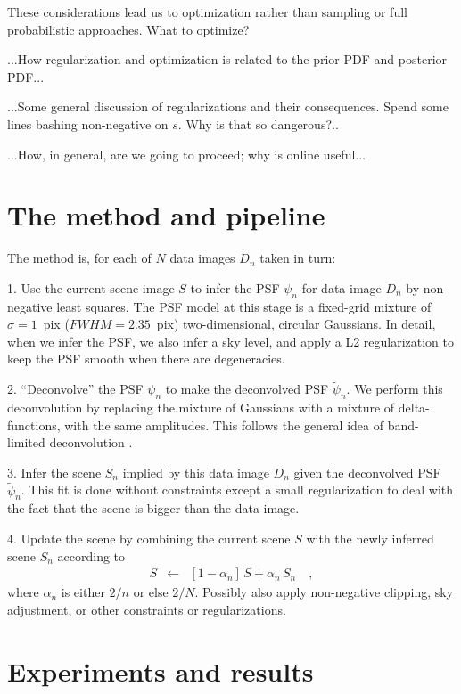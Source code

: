 \documentclass[12pt,preprint]{aastex}
\newcommand{\data}{D}
\newcommand{\scene}{S}
\newcommand{\psf}{\psi}
\newcommand{\dpsf}{\tilde{\psi}}
\begin{document}
These considerations lead us to optimization rather than sampling or
full probabilistic approaches.  What to optimize?

...How regularization and optimization is related to the prior PDF and posterior PDF...

...Some general discussion of regularizations and their consequences.
Spend some lines bashing non-negative on $s$.  Why is that so
dangerous?..

...How, in general, are we going to proceed; why is online useful...

\section{The method and pipeline}

The method is, for each of $N$ data images $\data_n$ taken in turn:

1. Use the current scene image $\scene$ to infer the PSF $\psf_n$ for data
image $\data_n$ by non-negative least squares.  The PSF model at this
stage is a fixed-grid mixture of $\sigma=1$~pix ($FWHM = 2.35$~pix)
two-dimensional, circular Gaussians.  In detail, when we infer the
PSF, we also infer a sky level, and apply a L2 regularization to keep
the PSF smooth when there are degeneracies.

2. ``Deconvolve'' the PSF $\psf_n$ to make the deconvolved PSF
$\dpsf_n$. We perform this deconvolution by replacing the mixture of
Gaussians with a mixture of delta-functions, with the same amplitudes.
This follows the general idea of band-limited deconvolution
\citep{magain}.

3. Infer the scene $\scene_n$ implied by this data image $\data_n$ given the
deconvolved PSF $\dpsf_n$.  This fit is done without constraints
except a small regularization to deal with the fact that the scene is
bigger than the data image.

4. Update the scene by combining the current scene $\scene$ with the newly
inferred scene $\scene_n$ according to
\begin{eqnarray}\displaystyle
S &\leftarrow& [1-\alpha_n]\,S + \alpha_n\,S_n
\quad ,
\end{eqnarray}
where $\alpha_n$ is either $2/n$ or else $2/N$.  Possibly also apply
non-negative clipping, sky adjustment, or other constraints or
regularizations.

\section{Experiments and results}
\end{document}
